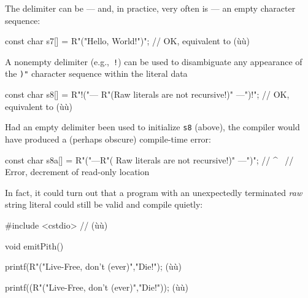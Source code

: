 The delimiter can be --- and, in practice, very often is --- an empty character
sequence:

\begin{emcppslisting}
const char s7[] = R"("Hello, World!")";
    // OK, equivalent to (ù{}ù)
\end{emcppslisting}
    
\noindent A nonempty delimiter (e.g.,~\lstinline|!|) can be used to disambiguate any
appearance of the \lstinline!)"! character sequence within the literal data

\begin{emcppslisting}
const char s8[] = R"!("--- R"(Raw literals are not recursive!)" ---")!";
    // OK, equivalent to (ù{}ù)
\end{emcppslisting}
    
\noindent Had an empty delimiter been used to initialize \lstinline!s8! (above), the
compiler would have produced a (perhaps obscure) compile-time error:

%
\begin{emcppslisting}[emcppserrorlines={1}]
const char s8a[] = R"("---R"( Raw literals are not recursive!)" ---")";         
    //                                                            ^~            
    // Error, decrement of read-only location
\end{emcppslisting}
    
\noindent In fact, it could turn out that a program with an unexpectedly
terminated \emph{raw} string literal could still be valid and compile
quietly:

\begin{emcppshiddenlisting}[emcppsbatch=e1]
#include <cstdio>   // (ù{}ù)
\end{emcppshiddenlisting}
\begin{emcppslisting}[emcppsbatch=e1]
void emitPith()
{
    printf(R"("Live-Free, don't (ever)","Die!");
        (ù{}ù)

    printf((R"("Live-Free, don't (ever)","Die!"));
        (ù{}ù)
}
\end{emcppslisting}
    
